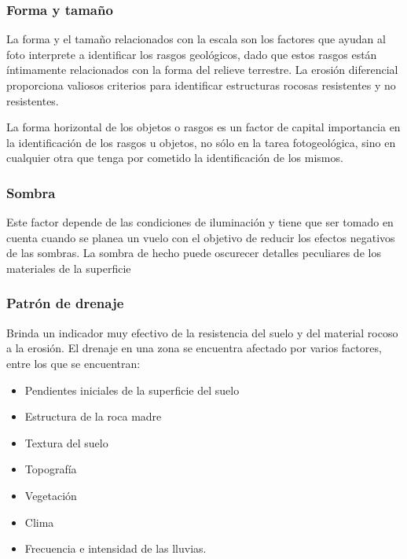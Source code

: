 \subsubsection{Forma y tamaño}

La forma y el tamaño relacionados con la escala son los factores que ayudan al foto interprete a identificar los rasgos geológicos, dado que estos rasgos están íntimamente relacionados con la forma del relieve terrestre. La erosión diferencial proporciona valiosos criterios para identificar estructuras rocosas resistentes y no resistentes.

La forma horizontal de los objetos o rasgos es un factor de capital importancia en la identificación de los rasgos u objetos, no sólo en la tarea fotogeológica, sino en cualquier otra que tenga por cometido la identificación de los mismos.

\subsubsection{Sombra}

Este factor depende de las condiciones de iluminación y tiene que ser tomado en cuenta cuando se planea un vuelo con el objetivo de reducir los efectos negativos de las sombras. La sombra de hecho puede oscurecer detalles peculiares de los materiales de la superficie

\subsubsection{Patrón de drenaje}

Brinda un indicador muy efectivo de la resistencia del suelo y del material rocoso a la erosión. El drenaje en una zona se encuentra afectado por varios factores, entre los que se encuentran: 

\begin{itemize}
  \item Pendientes iniciales de la superficie del suelo
  \item Estructura de la roca madre
  \item Textura del suelo
  \item Topografía
  \item Vegetación
  \item Clima
  \item Frecuencia e intensidad de las lluvias.
\end{itemize}

